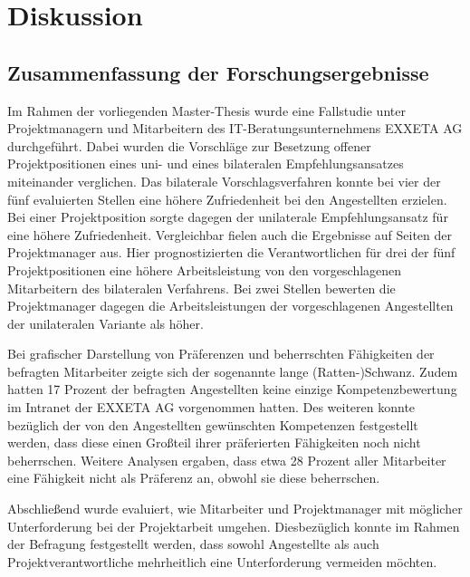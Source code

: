 \chapter{Diskussion}
\label{ch:diskussion}

\section{Zusammenfassung der Forschungsergebnisse}
\label{ch:diskussion:zusammenfassung}
Im Rahmen der vorliegenden Master-Thesis wurde eine Fallstudie unter Projektmanagern und Mitarbeitern des IT-Beratungsunternehmens EXXETA AG durchgeführt. Dabei wurden die Vorschläge zur Besetzung offener Projektpositionen eines uni- und eines bilateralen Empfehlungsansatzes miteinander verglichen. Das bilaterale Vorschlagsverfahren konnte bei vier der fünf evaluierten Stellen eine höhere Zufriedenheit bei den Angestellten erzielen. Bei einer Projektposition sorgte dagegen der unilaterale Empfehlungsansatz für eine höhere Zufriedenheit. Vergleichbar fielen auch die Ergebnisse auf Seiten der Projektmanager aus. Hier prognostizierten die Verantwortlichen für drei der fünf Projektpositionen eine höhere Arbeitsleistung von den vorgeschlagenen Mitarbeitern des bilateralen Verfahrens. Bei zwei Stellen bewerten die Projektmanager dagegen die Arbeitsleistungen der vorgeschlagenen Angestellten der unilateralen Variante als höher.

Bei grafischer Darstellung von Präferenzen und beherrschten Fähigkeiten der befragten Mitarbeiter zeigte sich der sogenannte lange (Ratten-)Schwanz. Zudem hatten 17 Prozent der befragten Angestellten keine einzige Kompetenzbewertung im Intranet der EXXETA AG vorgenommen hatten. Des weiteren konnte bezüglich der von den Angestellten gewünschten Kompetenzen festgestellt werden, dass diese einen Großteil ihrer präferierten Fähigkeiten noch nicht beherrschen. Weitere Analysen ergaben, dass etwa 28 Prozent aller Mitarbeiter eine Fähigkeit nicht als Präferenz an, obwohl sie diese beherrschen. 

Abschließend wurde evaluiert, wie Mitarbeiter und Projektmanager mit möglicher Unterforderung bei der Projektarbeit umgehen. Diesbezüglich konnte im Rahmen der Befragung festgestellt werden, dass sowohl Angestellte als auch Projektverantwortliche mehrheitlich eine Unterforderung vermeiden möchten.

